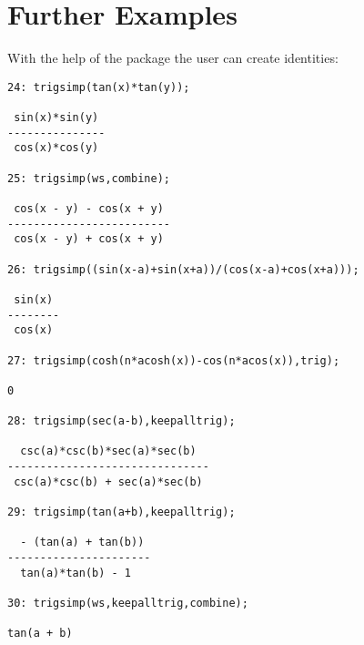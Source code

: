 \section{Further Examples}

With the help of the package the user can create identities:
{\small
\begin{verbatim}
24: trigsimp(tan(x)*tan(y));

 sin(x)*sin(y)
---------------
 cos(x)*cos(y)

25: trigsimp(ws,combine);

 cos(x - y) - cos(x + y)
-------------------------
 cos(x - y) + cos(x + y)

26: trigsimp((sin(x-a)+sin(x+a))/(cos(x-a)+cos(x+a)));

 sin(x)
--------
 cos(x)

27: trigsimp(cosh(n*acosh(x))-cos(n*acos(x)),trig);

0

28: trigsimp(sec(a-b),keepalltrig);

  csc(a)*csc(b)*sec(a)*sec(b)
-------------------------------
 csc(a)*csc(b) + sec(a)*sec(b)

29: trigsimp(tan(a+b),keepalltrig);

  - (tan(a) + tan(b))
----------------------
  tan(a)*tan(b) - 1

30: trigsimp(ws,keepalltrig,combine);

tan(a + b)
\end{verbatim}
}\noindent

